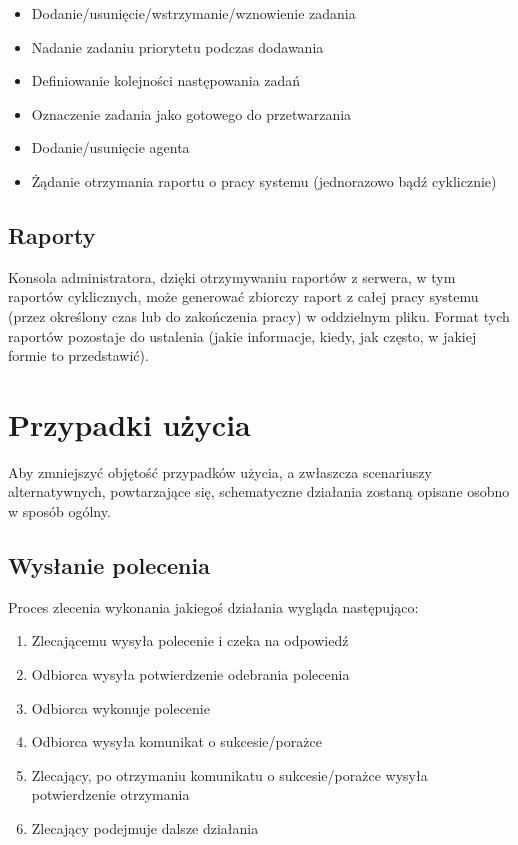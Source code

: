 \documentclass[10pt,a4paper]{article}
\begin{document}
			\begin{itemize}   
				\item Dodanie/usunięcie/wstrzymanie/wznowienie zadania
				\item Nadanie zadaniu priorytetu podczas dodawania
				\item Definiowanie kolejności następowania zadań
				\item Oznaczenie zadania jako gotowego do przetwarzania
				\item Dodanie/usunięcie agenta
				\item Żądanie otrzymania raportu o pracy systemu (jednorazowo bądź cyklicznie)
			\end{itemize}
		
		\subsection{Raporty}
			Konsola administratora, dzięki otrzymywaniu raportów z serwera, w tym raportów cyklicznych, może generować zbiorczy raport z całej pracy systemu (przez określony czas lub do zakończenia pracy) w oddzielnym pliku. Format tych raportów pozostaje do ustalenia (jakie informacje, kiedy, jak często, w jakiej formie to przedstawić).
    
    \section{Przypadki użycia}
        Aby zmniejszyć objętość przypadków użycia, a zwłaszcza scenariuszy alternatywnych, powtarzające się, schematyczne działania zostaną opisane osobno w sposób ogólny.                    
        
        \subsection{Wysłanie polecenia}
            Proces zlecenia wykonania jakiegoś działania wygląda następująco:
            
			\begin{enumerate}
	            \item Zlecającemu wysyła polecenie i czeka na odpowiedź
	            \item Odbiorca wysyła potwierdzenie odebrania polecenia
	            \item Odbiorca wykonuje polecenie
	            \item Odbiorca wysyła komunikat o sukcesie/porażce
	            \item Zlecający, po otrzymaniu komunikatu o sukcesie/porażce wysyła potwierdzenie otrzymania
	            \item Zlecający podejmuje dalsze działania 
			\end{enumerate} 
		 
\end{document}
